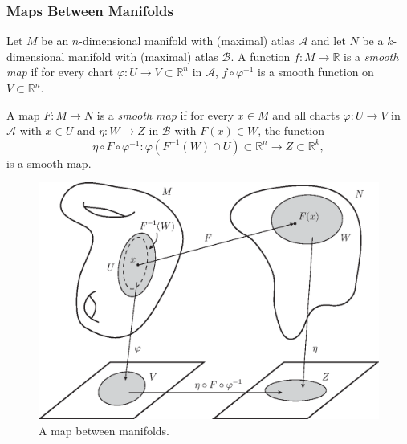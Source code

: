 \subsubsection{Maps Between Manifolds}
\begin{definition}
Let $M$ be an $n$-dimensional manifold with (maximal) atlas $\mathcal{A}$ and let $N$ be a $k$-dimensional manifold with (maximal) atlas $\mathcal{B}$. A function $f:M\to\mathbb{R}$ is a \textit{smooth map} if for every chart $\varphi:U\to V\subset\mathbb{R}^n$ in $\mathcal{A}$, $f\circ\varphi^{-1}$ is a smooth function on $V\subset\mathbb{R}^n$.

A map $F:M\to N$ is a \textit{smooth map} if for every $x\in M$ and all charts $\varphi:U\to V$ in $\mathcal{A}$ with $x\in U$ and $\eta:W\to Z$ in $\mathcal{B}$ with $F(x)\in W$, the function
\[
\eta\circ F\circ\varphi^{-1}:\varphi(F^{-1}(W)\cap U)\subset\mathbb{R}^n\to Z\subset\mathbb{R}^k,
\]
is a smooth map.
\end{definition}   

\begin{figure}[h!]
\centering
\includegraphics[scale=0.7]{fig/mani-map-1b}
\caption{A map between manifolds.}
\label{fig:mani-map-1}
\end{figure}

